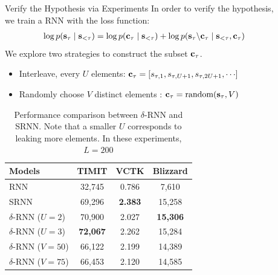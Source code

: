 \documentclass[final]{beamer}
\newlength{\sepwidth}
\newlength{\colwidth}
\newcommand{\separatorcolumn}{\begin{column}{\sepwidth}\end{column}}
\begin{document}
\begin{frame}[t]
\begin{columns}[t]
\begin{column}{\colwidth}
\end{column}

\separatorcolumn

\begin{column}{\colwidth}

  \begin{block}{Verify the Hypothesis via Experiments}
	In order to verify the hypothesis, we train a RNN with the loss function: 
	\begin{align*}
		\log p({\mathbf{s}}_{\tau} \mid {\mathbf{s}}_{<\tau}) = \log p({\mathbf{c}}_{\tau} \mid {\mathbf{s}}_{<\tau}) + \log p({\mathbf{s}}_{\tau} \backslash {\mathbf{c}}_{\tau} \mid {\mathbf{s}}_{<\tau}, {\mathbf{c}}_{\tau})
	\end{align*}
	We explore two strategies to construct the subset ${\mathbf{c}}_{\tau}$.
	\begin{itemize}
		\item Interleave, every $U$ elements: ${\mathbf{c}}_{\tau} = \left[ {s_{\tau,1}, s_{\tau,U+1}, s_{\tau,2U+1}, \cdots } \right]$
		\item Randomly choose $V$ distinct elements : ${\mathbf{c}}_{\tau} = \text{random}({\mathbf{s}}_{\tau}, V)$
	\end{itemize}

	\begin{table}[!h]
		\centering
		\begin{tabular}{l|c c c}
			\toprule
			\bf Models               & \bf TIMIT  & \bf VCTK  & \bf Blizzard \\
			\midrule
			RNN                       & 32,745     & 0.786     & 7,610  \\
			SRNN                      & 69,296       & \bf 2.383 & 15,258 \\
			\midrule
			$\delta$-RNN ($U = 2$)   & 70,900     & 2.027     & \bf 15,306 \\
			$\delta$-RNN ($U = 3$)   & \bf 72,067 & 2.262     & 15,284 \\
			\midrule
			$\delta$-RNN ($V = 50$)  & 66,122     & 2.199     & 14,389 \\
			$\delta$-RNN ($V = 75$)  & 66,453     & 2.120     & 14,585 \\
			\bottomrule
		\end{tabular}
		\caption{Performance comparison between $\delta$-RNN and SRNN. Note that a smaller $U$ corresponds to leaking more elements. In these experiments, $L=200$}
		\vspace{-1.5em}
		\label{tab:inter_step_correlation}
	\end{table}
  \end{block}


\end{column}
\end{columns}
\end{frame}
\end{document}
